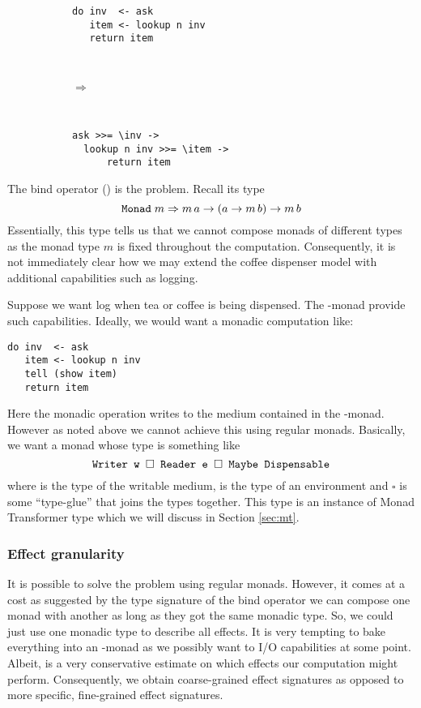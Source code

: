 \begin{figure*}[h]
\centering
\begin{subfigure}[c]{0.40\linewidth}
\begin{lstlisting}[style={haskell}]
do inv  <- ask
   item <- lookup n inv
   return item
\end{lstlisting}
\end{subfigure}
~
\begin{subfigure}[c]{0.1\linewidth}
$\Rightarrow$
\end{subfigure}
~
\begin{subfigure}[c]{0.40\linewidth}
\centering
\begin{lstlisting}[style={haskell}]
ask >>= \inv -> 
  lookup n inv >>= \item ->
      return item
\end{lstlisting}
\end{subfigure}
\end{figure*}

The bind operator (\code{>>=}) is the problem. Recall its type
\[ \texttt{Monad}\; m \Rightarrow m\, a \to (a \to m\, b) \to m\, b \]
Essentially, this type tells us that we cannot compose monads of different types as the monad type $m$ is fixed throughout the computation. Consequently, it is not immediately clear how we may extend the coffee dispenser model with additional capabilities such as logging.

Suppose we want log when tea or coffee is being dispensed. The -monad provide such capabilities. Ideally, we would want a monadic computation like:
\begin{lstlisting}[style={haskell}]
do inv  <- ask
   item <- lookup n inv
   tell (show item)
   return item
\end{lstlisting}
Here the monadic operation  writes to the medium contained in the -monad. However as noted above we cannot achieve this using regular monads. Basically, we want a monad whose type is something like
\[ \texttt{Writer w $\square$ Reader e $\square$ Maybe Dispensable} \]
where  is the type of the writable medium,  is the type of an environment and $\square$ is some ``type-glue'' that joins the types together. This type is an instance of Monad Transformer type which we will discuss in Section \ref{sec:mt}. 

\subsubsection{Effect granularity}%
It is possible to solve the problem using regular monads. However, it comes at a cost as suggested by the type signature of the bind operator we can compose one monad with another as long as they got the same monadic type. So, we could just use one monadic type to describe all effects. It is very tempting to bake everything into an -monad as we possibly want to I/O capabilities at some point. Albeit,  is a very conservative estimate on which effects our computation might perform. Consequently, we obtain coarse-grained effect signatures as opposed to more specific, fine-grained effect signatures.

